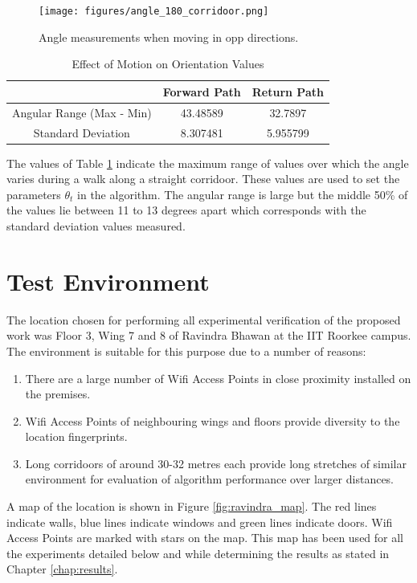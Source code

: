 \begin{figure}\centering
    \texttt{[image: figures/angle\_180\_corridoor.png]}
    \caption{Angle measurements when moving in opp directions.\label{fig:angle_180_corridoor}}
\end{figure}

\begin{table}
\centering
\begin{tabular}{c c c}
\hline
\hline
 & Forward Path & Return Path \\
\hline
Angular Range (Max - Min) & 43.48589 & 32.7897 \\
Standard Deviation & 8.307481 & 5.955799 \\
\hline
\end{tabular}
\caption{Effect of Motion on Orientation Values\label{tbl:angle_motion}}
\end{table}

The values of Table \ref{tbl:angle_motion} indicate the maximum range of 
values over which the angle varies during a walk along a straight corridoor. 
These values are used to set the parameters $\theta_t$ in the algorithm.
The angular range is large but the middle 50\% of the values lie 
between 11 to 13 degrees apart which corresponds with the standard deviation
values measured.

\section{Test Environment\label{sec:test_environment}}

The location chosen for performing all experimental verification of the
proposed work was Floor 3, Wing 7 and 8 of Ravindra Bhawan at the IIT Roorkee
campus. The environment is suitable for this purpose due to a number of reasons:

\begin{enumerate}
\item There are a large number of Wifi Access Points in close proximity 
    installed on the premises.
\item Wifi Access Points of neighbouring wings and floors provide diversity
    to the location fingerprints.
\item Long corridoors of around 30-32 metres each provide long stretches of
    similar environment for evaluation of algorithm performance over larger
    distances.
\end{enumerate}

A map of the location is shown in Figure \ref{fig:ravindra_map}. The red lines
indicate walls, blue lines indicate windows and green lines indicate doors.
Wifi Access Points are marked with stars on the map. This map has been used
for all the experiments detailed below and while determining the results as 
stated in Chapter \ref{chap:results}.

